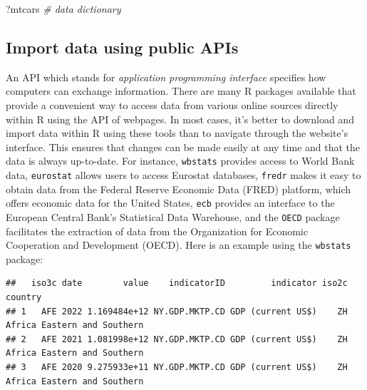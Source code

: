 \documentclass[
  12pt,
  oneside]{book}
\newenvironment{Shaded}{\begin{snugshade}}{\end{snugshade}}
\newcommand{\AttributeTok}[1]{\textcolor[rgb]{0.13,0.29,0.53}{#1}}
\newcommand{\CommentTok}[1]{\textcolor[rgb]{0.56,0.35,0.01}{\textit{#1}}}
\newcommand{\DecValTok}[1]{\textcolor[rgb]{0.00,0.00,0.81}{#1}}
\newcommand{\FunctionTok}[1]{\textcolor[rgb]{0.13,0.29,0.53}{\textbf{#1}}}
\newcommand{\NormalTok}[1]{#1}
\newcommand{\OtherTok}[1]{\textcolor[rgb]{0.56,0.35,0.01}{#1}}
\newcommand{\StringTok}[1]{\textcolor[rgb]{0.31,0.60,0.02}{#1}}
\theoremstyle{definition}
\theoremstyle{definition}
\theoremstyle{definition}
\theoremstyle{definition}
\theoremstyle{remark}
\begin{document}
\begin{Shaded}
\begin{Highlighting}[]
\NormalTok{?mtcars  }\CommentTok{\# data dictionary}
\end{Highlighting}
\end{Shaded}

\hypertarget{import-data-using-public-apis}{%
\subsection{Import data using public APIs}\label{import-data-using-public-apis}}

An API which stands for \emph{application programming interface} specifies how computers can exchange information. There are many R packages available that provide a convenient way to access data from various online sources directly within R using the API of webpages. In most cases, it's better to download and import data within R using these tools than to navigate through the website's interface. This ensures that changes can be made easily at any time and that the data is always up-to-date. For instance, \texttt{wbstats} provides access to World Bank data, \texttt{eurostat} allows users to access Eurostat databases, \texttt{fredr} makes it easy to obtain data from the Federal Reserve Economic Data (FRED) platform, which offers economic data for the United States, \texttt{ecb} provides an interface to the European Central Bank's Statistical Data Warehouse, and the \texttt{OECD} package facilitates the extraction of data from the Organization for Economic Cooperation and Development (OECD). Here is an example using the \texttt{wbstats} package:

\begin{Shaded}
\end{Shaded}

\begin{verbatim}
##   iso3c date        value    indicatorID         indicator iso2c                     country
## 1   AFE 2022 1.169484e+12 NY.GDP.MKTP.CD GDP (current US$)    ZH Africa Eastern and Southern
## 2   AFE 2021 1.081998e+12 NY.GDP.MKTP.CD GDP (current US$)    ZH Africa Eastern and Southern
## 3   AFE 2020 9.275933e+11 NY.GDP.MKTP.CD GDP (current US$)    ZH Africa Eastern and Southern
\end{verbatim}
\end{document}
